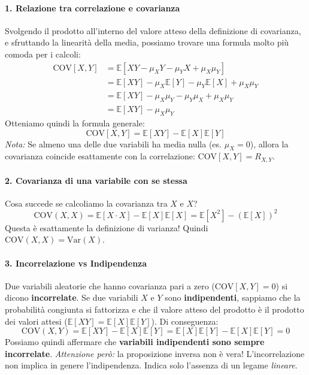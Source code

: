 \paragraph{1. Relazione tra correlazione e covarianza}
Svolgendo il prodotto all'interno del valore atteso della definizione di covarianza, e sfruttando la linearità della media, possiamo trovare una formula molto più comoda per i calcoli:
\begin{align*}
    \text{COV}[X, Y] &= \mathbb{E}[XY - \mu_X Y - \mu_Y X + \mu_X\mu_Y] \\
    &= \mathbb{E}[XY] - \mu_X\mathbb{E}[Y] - \mu_Y\mathbb{E}[X] + \mu_X\mu_Y \\
    &= \mathbb{E}[XY] - \mu_X\mu_Y - \mu_Y\mu_X + \mu_X\mu_Y \\
    &= \mathbb{E}[XY] - \mu_X\mu_Y
\end{align*}
Otteniamo quindi la formula generale:
\begin{equation}
    \boxed{\text{COV}[X, Y] = \mathbb{E}[XY] - \mathbb{E}[X]\mathbb{E}[Y]}
\end{equation}
\textit{Nota:} Se almeno una delle due variabili ha media nulla (es. $\mu_X = 0$), allora la covarianza coincide esattamente con la correlazione: $\text{COV}[X, Y] = R_{X,Y}$.

\paragraph{2. Covarianza di una variabile con se stessa}
Cosa succede se calcoliamo la covarianza tra $X$ e $X$?
\[
\text{COV}(X, X) = \mathbb{E}[X \cdot X] - \mathbb{E}[X]\mathbb{E}[X] = \mathbb{E}[X^2] - (\mathbb{E}[X])^2
\]
Questa è esattamente la definizione di varianza! Quindi $\text{COV}(X, X) = \text{Var}(X)$.

\paragraph{3. Incorrelazione vs Indipendenza}
Due variabili aleatorie che hanno covarianza pari a zero ($\text{COV}[X, Y] = 0$) si dicono \textbf{incorrelate}.
Se due variabili $X$ e $Y$ sono \textbf{indipendenti}, sappiamo che la probabilità congiunta si fattorizza e che il valore atteso del prodotto è il prodotto dei valori attesi ($\mathbb{E}[XY] = \mathbb{E}[X]\mathbb{E}[Y]$). Di conseguenza:
\[
\text{COV}(X, Y) = \mathbb{E}[XY] - \mathbb{E}[X]\mathbb{E}[Y] = \mathbb{E}[X]\mathbb{E}[Y] - \mathbb{E}[X]\mathbb{E}[Y] = 0
\]
Possiamo quindi affermare che \textbf{variabili indipendenti sono sempre incorrelate}.
\textit{Attenzione però:} la proposizione inversa non è vera! L'incorrelazione non implica in genere l'indipendenza. Indica solo l'assenza di un legame \textit{lineare}.

